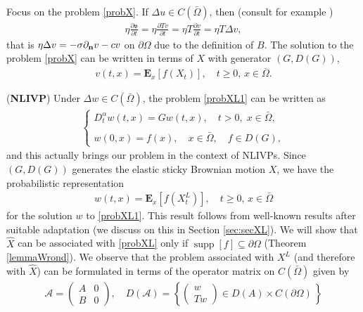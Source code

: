 \documentclass[11pt,a4paper]{article}
\begin{document}
Focus on the problem \eqref{probX}. If $\Delta u \in C(\bar{\Omega})$, then (consult for example \cite{EngFra05})
\begin{align}
\label{SameArgs}
\eta \frac{\partial \mathfrak{v}}{\partial t} = \eta \frac{\partial Tv}{\partial t} = \eta T \frac{\partial v}{\partial t} = \eta T \Delta v,
\end{align}
that is $\eta \Delta v = - \sigma \partial_{\bf n} v - c v$ on $\partial \Omega$ due to the definition of $B$. The solution to the problem \eqref{probX} can be written in terms of $X$ with generator $(G,D(G))$, 
\begin{align*}
v(t,x) = \mathbf{E}_x[f(X_t)], \quad t\geq 0,\, x \in \bar{\Omega}.
\end{align*}  



({\bf NLIVP}) Under $\Delta w \in C(\bar{\Omega})$, the problem \eqref{probXL1} can be written as
\begin{align}
\left\lbrace
\begin{array}{l}
\displaystyle D^\alpha_t w(t,x) = G w(t,x), \quad t>0, \; x \in \bar{\Omega}, \\
\\
\displaystyle w(0,x) = f(x), \quad x \in \bar{\Omega}, \quad f \in D(G),
\end{array}
\right .
\label{probXL}
\end{align}
and this actually brings our problem in the context of NLIVPs. Since $(G, D(G))$ generates the elastic sticky Brownian motion $X$, we have the probabilistic representation  
\begin{align*}
w(t,x) = \mathbf{E}_x[f(X^L_t)], \quad t\geq 0, \, x\in \bar{\Omega}
\end{align*}
for the solution $w$ to \eqref{probXL1}. This result follows from well-known results after suitable adaptation (we discuss on this in Section \ref{sec:secXL}). We will show that $\hat{X}$ can be associated with \eqref{probXL} only if $\operatorname{supp}[f] \subseteq \partial \Omega$ (Theorem \ref{lemmaWrond}). We observe that the problem associated with $X^L$ (and therefore with $\hat{X}$) can be formulated in terms of the operator matrix on $C(\bar{\Omega})$ given by
\begin{align}
\mathcal{A} = \left( \begin{array}{cc}
A & 0\\
B & 0
\end{array} \right), \quad D(\mathcal{A}) = \left\lbrace \left( \begin{array}{c} w\\ Tw \end{array} \right) \in D(A) \times C(\partial \Omega)\, \right\rbrace
\end{align}
\end{document}
